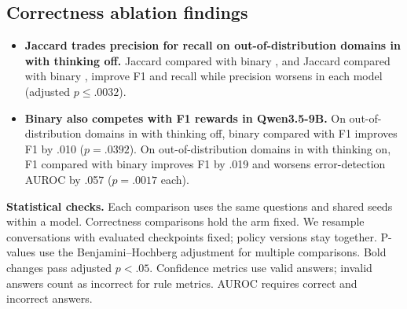 \subsection*{Correctness ablation findings}
\begin{itemize}
\item \textbf{Jaccard trades precision for recall on out-of-distribution domains in \SP{} with thinking off.} Jaccard \armC{} compared with binary \armC{}, and Jaccard \armD{} compared with binary \armD{}, improve F1 and recall while precision worsens in each model (adjusted $p\leq.0032$).
\item \textbf{Binary also competes with F1 rewards in Qwen3.5-9B.} On out-of-distribution domains in \DB{} with thinking off, binary \armC{} compared with F1 \armC{} improves F1 by .010 ($p=.0392$). On out-of-distribution domains in \SP{} with thinking on, F1 \armB{} compared with binary \armB{} improves F1 by .019 and worsens error-detection AUROC by .057 ($p=.0017$ each).
\end{itemize}
{\fontsize{8.5}{9.6}\selectfont\textbf{Statistical checks.} Each comparison uses the same questions and shared seeds within a model. Correctness comparisons hold the arm fixed. We resample conversations with evaluated checkpoints fixed; policy versions stay together. P-values use the Benjamini--Hochberg adjustment for multiple comparisons. Bold changes pass adjusted $p<.05$. Confidence metrics use valid answers; invalid answers count as incorrect for rule metrics. AUROC requires correct and incorrect answers.}
\endgroup

